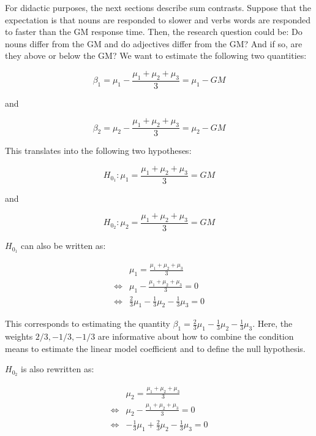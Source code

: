 \documentclass[
  12pt,
]{krantz}
\theoremstyle{definition}
\theoremstyle{definition}
\theoremstyle{definition}
\theoremstyle{definition}
\theoremstyle{remark}
\begin{document}
For didactic purposes, the next sections describe sum contrasts. Suppose that the expectation is that nouns are responded to slower and verbs words are responded to faster than the GM response time. Then, the research question could be: Do nouns differ from the GM and do adjectives differ from the GM? And if so, are they above or below the GM? We want to estimate the following two quantities:

\begin{equation}
\beta_1 = \mu_1 - \frac{\mu_1+\mu_2+\mu_3}{3} = \mu_1 - GM
\end{equation}

\noindent
and

\begin{equation}
\beta_2 = \mu_2 - \frac{\mu_1+\mu_2+\mu_3}{3} = \mu_2 - GM
\end{equation}

This translates into the following two hypotheses:

\begin{equation}
H_{0_1}: \mu_1 = \frac{\mu_1+\mu_2+\mu_3}{3} = GM
\end{equation}

\noindent
and

\begin{equation}
H_{0_2}: \mu_2 = \frac{\mu_1+\mu_2+\mu_3}{3} = GM
\end{equation}

\(H_{0_1}\) can also be written as:

\begin{align} \label{h01}
& \mu_1 =\frac{\mu_1+\mu_2+\mu_3}{3}\\
\Leftrightarrow & \mu_1 - \frac{\mu_1+\mu_2+\mu_3}{3} = 0\\
\Leftrightarrow & \frac{2}{3} \mu_1 - \frac{1}{3}\mu_2 - \frac{1}{3}\mu_3 = 0
\end{align}

\noindent
This corresponds to estimating the quantity \(\beta_1 = \frac{2}{3} \mu_1 - \frac{1}{3}\mu_2 - \frac{1}{3}\mu_3\).
Here, the weights \(2/3, -1/3, -1/3\) are informative about how to combine the condition means to estimate the linear model coefficient and to define the null hypothesis.

\(H_{0_2}\) is also rewritten as:

\begin{align}\label{h02}
&  \mu_2 = \frac{\mu_1+\mu_2+\mu_3}{3}\\
\Leftrightarrow & \mu_2 - \frac{\mu_1+\mu_2+\mu_3}{3} = 0 \\
\Leftrightarrow & -\frac{1}{3}\mu_1 + \frac{2}{3} \mu_2 - \frac{1}{3} \mu_3 = 0
\end{align}
\end{document}
